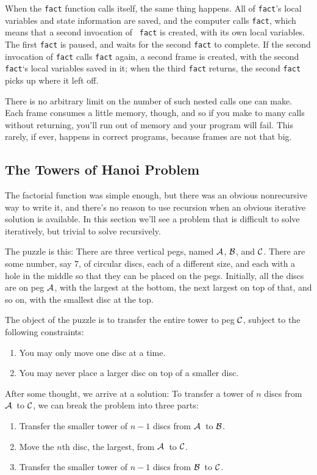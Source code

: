 When the {\tt fact} function calls itself, the same thing happens.  All
of {\tt fact}'s local variables and state information are saved, and the
computer calls {\tt fact}, which means that a second invocation of {\tt
fact} is created, with its own local variables.  The first {\tt fact} is
paused, and waits for the second {\tt fact} to complete.  If the second
invocation of {\tt fact} calls {\tt fact} again, a second frame is
created, with the second {\tt fact}`s local variables saved in it; when
the third {\tt fact} returns, the second {\tt fact} picks up where it
left off.

There is no arbitrary limit on the number of such nested calls one can
make.  Each frame consumes a little memory, though, and so if you make
to many calls without returning, you'll run out of memory and your
program will fail.  This rarely, if ever, happens in correct programs,
because frames are not that big.

\subsection{The Towers of Hanoi Problem}

The factorial function was simple enough, but there was an obvious
nonrecursive way to write it, and there's no reason to use recursion
when an obvious iterative solution is available.  In this section we'll
see a problem that is difficult to solve iteratively, but trivial to
solve recursively.

\def\AA{\mbox{$\cal A$}}
\def\BB{\mbox{$\cal B$}}
\def\CC{\mbox{$\cal C$}}

The puzzle is this:  There are three vertical pegs, named \AA, \BB,
and \CC.  There are some number, say 7, of circular discs, each of a
different size, and each with a hole in the middle so that they can be
placed on the pegs.  Initially, all the discs are on peg \AA, with
the largest at the bottom, the next largest on top of that, and so on,
with the smallest disc at the top.

The object of the puzzle is to transfer the entire tower to peg \CC,
subject to the following constraints:

\begin{enumerate}
\item You may only move one disc at a time.
\item You may never place a larger disc on top of a smaller disc.
\end{enumerate}

After some thought, we arrive at a solution:  To transfer a tower of $n$
discs from \AA\ to \CC, we can break the problem into three parts:
\begin{enumerate}
\item Transfer the smaller tower of $n-1$ discs from \AA\ to \BB.
\item Move the $n$th disc, the largest, from \AA\ to \CC.
\item Transfer the smaller tower of $n-1$ discs from \BB\ to \CC.
\end{enumerate}

